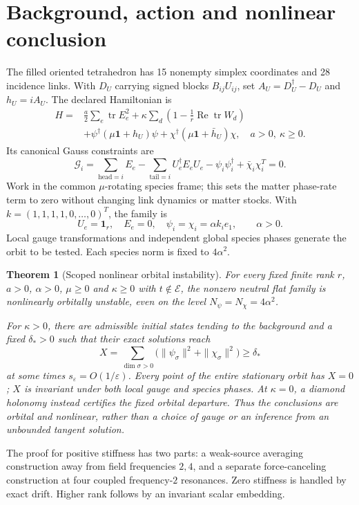 \documentclass[11pt,a4paper]{article}
\newtheorem{theorem}{Theorem}\newtheorem{lemma}[theorem]{Lemma}\newtheorem{proposition}[theorem]{Proposition}
\newcommand{\tr}{\operatorname{tr}}\newcommand{\Rea}{\operatorname{Re}}\newcommand{\U}{\mathrm U}
\newcommand{\id}{\mathbf1}\newcommand{\dd}{\mathrm d}\newcommand{\diag}{\operatorname{diag}}
\begin{document}
\newpage
\section{Background, action and nonlinear conclusion}
The filled oriented tetrahedron has 15 nonempty simplex coordinates and 28 incidence links. With $D_U$ carrying signed blocks $B_{ij}U_{ij}$, set $A_U=D_U^\dagger-D_U$ and $h_U=iA_U$. The declared Hamiltonian is
\begin{align*}
H={}&\frac a2\sum_e\tr E_e^2+\kappa\sum_d\left(1-\frac1r\Rea\tr W_d\right)\\
&+\psi^\dagger(\mu\id+h_U)\psi+
\chi^\dagger(\mu\id+\bar h_U)\chi,
\quad a>0,\ \kappa\geq0.
\end{align*}
Its canonical Gauss constraints are
\[
\mathcal G_i=\sum_{\mathrm{head}=i}E_e-\sum_{\mathrm{tail}=i}U_e^\dagger E_eU_e
-\psi_i\psi_i^\dagger+\bar\chi_i\chi_i^T=0.
\]
Work in the common $\mu$-rotating species frame; this sets the matter phase-rate term to zero without changing link dynamics or matter stocks. With $k=(1,1,1,1,0,\ldots,0)^T$, the family is
\begin{equation}
U_e=\id_r,\quad E_e=0,\quad \psi_i=\chi_i=\alpha k_i e_1,\qquad\alpha>0.
\end{equation}
Local gauge transformations and independent global species phases generate the orbit to be tested. Each species norm is fixed to $4\alpha^2$.

\begin{theorem}[Scoped nonlinear orbital instability]\label{th:main}
For every fixed finite rank $r$, $a>0$, $\alpha>0$, $\mu\geq0$ and $\kappa\geq0$ with $t\notin\mathcal E$, the nonzero neutral flat family is nonlinearly orbitally unstable, even on the level $N_\psi=N_\chi=4\alpha^2$.

For $\kappa>0$, there are admissible initial states tending to the background and a fixed $\delta_*>0$ such that their exact solutions reach
\begin{equation}
X=\sum_{\dim\sigma>0}\bigl(\|\psi_\sigma\|^2+\|\chi_\sigma\|^2\bigr)\geq\delta_*\label{eq:observable}
\end{equation}
at some times $s_\varepsilon=O(1/\varepsilon)$. Every point of the entire stationary orbit has $X=0$; $X$ is invariant under both local gauge and species phases. At $\kappa=0$, a diamond holonomy instead certifies the fixed orbital departure. Thus the conclusions are orbital and nonlinear, rather than a choice of gauge or an inference from an unbounded tangent solution.
\end{theorem}
The proof for positive stiffness has two parts: a weak-source averaging construction away from field frequencies $2,4$, and a separate force-canceling construction at four coupled frequency-$2$ resonances. Zero stiffness is handled by exact drift. Higher rank follows by an invariant scalar embedding.
\end{document}
